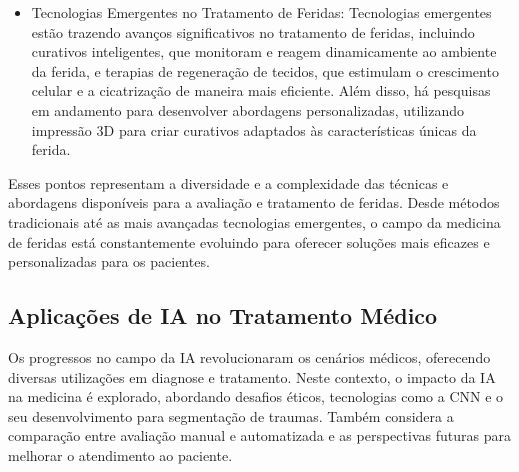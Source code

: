 \begin{itemize}
    \item Tecnologias Emergentes no Tratamento de Feridas: Tecnologias emergentes estão trazendo avanços significativos no tratamento de feridas, incluindo curativos inteligentes, que monitoram e reagem dinamicamente ao ambiente da ferida, e terapias de regeneração de tecidos, que estimulam o crescimento celular e a cicatrização de maneira mais eficiente. Além disso, há pesquisas em andamento para desenvolver abordagens personalizadas, utilizando impressão 3D para criar curativos adaptados às características únicas da ferida.
    
\end{itemize}

    Esses pontos representam a diversidade e a complexidade das técnicas e abordagens disponíveis para a avaliação e tratamento de feridas. Desde métodos tradicionais até as mais avançadas tecnologias emergentes, o campo da medicina de feridas está constantemente evoluindo para oferecer soluções mais eficazes e personalizadas para os pacientes.

\subsection{Aplicações de IA no Tratamento Médico}

Os progressos no campo da \ac{IA} revolucionaram os cenários médicos, oferecendo diversas utilizações em diagnose e tratamento. Neste contexto, o impacto da \ac{IA} na medicina é explorado, abordando desafios éticos, tecnologias como a \ac{CNN} e o seu desenvolvimento para segmentação de traumas. Também considera a comparação entre avaliação manual e automatizada e as perspectivas futuras para melhorar o atendimento ao paciente. 

